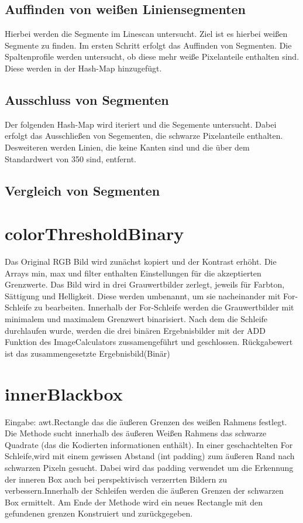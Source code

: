 \documentclass[a4paper,11pt,parskip]{article}
\begin{document}
\subsection{Auffinden von weißen Liniensegmenten}
Hierbei werden die Segmente im Linescan untersucht. Ziel ist es hierbei weißen Segmente zu finden. Im ersten Schritt erfolgt das Auffinden von Segmenten. Die Spaltenprofile werden untersucht, ob diese mehr weiße Pixelanteile enthalten sind. Diese werden in der Hash-Map hinzugefügt.\\

\subsection{Ausschluss von Segmenten}
Der folgenden Hash-Map wird iteriert und die Segemente untersucht. Dabei erfolgt das Ausschließen von Segementen, die schwarze Pixelanteile enthalten. Desweiteren werden Linien, die keine Kanten sind und die über dem Standardwert von 350 sind, entfernt. 

\subsection{Vergleich von Segmenten}


\section{colorThresholdBinary}
Das Original RGB Bild wird zunächst kopiert und der Kontrast erhöht. Die Arrays min, max und filter enthalten Einstellungen für die akzeptierten Grenzwerte. Das Bild wird in drei Grauwertbilder zerlegt, jeweils für Farbton, Sättigung und Helligkeit. Diese werden umbenannt, um sie nacheinander mit For-Schleife zu bearbeiten. Innerhalb der For-Schleife werden die Grauwertbilder mit minimalem und maximalem Grenzwert binarisiert. Nach dem die Schleife durchlaufen wurde, werden die drei binären Ergebnisbilder mit der ADD Funktion des ImageCalculators zussamengeführt und geschlossen. Rückgabewert ist das zusammengesetzte Ergebnisbild(Binär)

\section{innerBlackbox}
Eingabe: awt.Rectangle das die äußeren Grenzen des weißen Rahmens festlegt.
Die Methode sucht innerhalb des äußeren Weißen Rahmens das schwarze Quadrate (das die Kodierten informationen enthält). In einer geschachtelten For Schleife,wird mit einem gewissen Abstand (int padding) zum äußeren Rand nach schwarzen Pixeln gesucht. Dabei wird das padding verwendet um die Erkennung der inneren Box auch bei perspektivisch verzerrten Bildern zu verbessern.Innerhalb der Schleifen werden die äußeren Grenzen der schwarzen Box ermittelt. Am Ende der Methode wird ein neues Rectangle mit den gefundenen grenzen Konstruiert und zurückgegeben.

\end{document}
